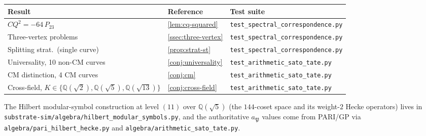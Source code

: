 \documentclass[11pt,a4paper]{article}
\theoremstyle{plain}
\theoremstyle{definition}
\theoremstyle{remark}
\numberwithin{equation}{section}
\providecommand{\Q}{\mathbb{Q}}
\begin{document}
\begin{center}
\begin{tabular}{lll}
\toprule
\textbf{Result} & \textbf{Reference} & \textbf{Test suite} \\
\midrule
$CQ^2 = -64\, P_{23}$ & \cref{lem:cq-squared} & \texttt{test\_spectral\_correspondence.py} \\
Three-vertex problems & \cref{ssec:three-vertex} & \texttt{test\_spectral\_correspondence.py} \\
Splitting strat.\ (single curve) & \cref{prop:strat-st} & \texttt{test\_spectral\_correspondence.py} \\
Universality, 10 non-CM curves & \cref{conj:universality} & \texttt{test\_arithmetic\_sato\_tate.py} \\
CM distinction, 4 CM curves & \cref{conj:cm} & \texttt{test\_arithmetic\_sato\_tate.py} \\
Cross-field, $K \in \{\Q(\sqrt 2), \Q(\sqrt 5), \Q(\sqrt{13})\}$ & \cref{conj:cross-field} & \texttt{test\_arithmetic\_sato\_tate.py} \\
\bottomrule
\end{tabular}
\end{center}

The Hilbert modular-symbol construction at level $(11)$ over
$\Q(\sqrt 5)$ (the $144$-coset space and its weight-$2$ Hecke
operators) lives in
\texttt{substrate-sim/algebra/hilbert\_modular\_symbols.py}, and
the authoritative $a_\mathfrak{P}$ values come from PARI/GP via
\texttt{algebra/pari\_hilbert\_hecke.py} and
\texttt{algebra/arithmetic\_sato\_tate.py}.
\end{document}
